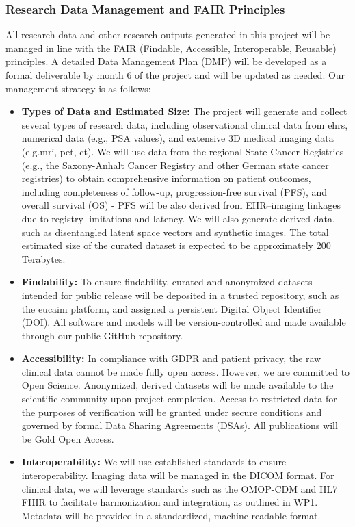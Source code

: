 \documentclass[11pt, a4paper]{article}
\begin{document}
\subsubsection{Research Data Management and FAIR Principles}
All research data and other research outputs generated in this project will be managed in line with the FAIR (Findable, Accessible, Interoperable, Reusable) principles. A detailed Data Management Plan (DMP) will be developed as a formal deliverable by month 6 of the project and will be updated as needed. Our management strategy is as follows:
\begin{itemize}
    \item \textbf{Types of Data and Estimated Size:} The project will generate and collect several types of research data, including observational clinical data from \gls{ehr}s, numerical data (e.g., PSA values), and extensive 3D medical imaging data (e.g.\gls{mri}, \gls{pet}, \gls{ct}). We will use data from the regional State Cancer Registries (e.g., the Saxony-Anhalt Cancer Registry and other German state cancer registries) to obtain comprehensive information on patient outcomes, including completeness of follow-up, progression-free survival (PFS), and overall survival (OS) - PFS will be also derived from EHR–imaging linkages due to registry limitations and latency. We will also generate derived data, such as disentangled latent space vectors and synthetic images. The total estimated size of the curated dataset is expected to be approximately 200 Terabytes.
    \item \textbf{Findability:} To ensure findability, curated and anonymized datasets intended for public release will be deposited in a trusted repository, such as the \gls{eucaim} platform, and assigned a persistent Digital Object Identifier (DOI). All software and models will be version-controlled and made available through our public GitHub repository.
    \item \textbf{Accessibility:} In compliance with GDPR and patient privacy, the raw clinical data cannot be made fully open access. However, we are committed to Open Science. Anonymized, derived datasets will be made available to the scientific community upon project completion. Access to restricted data for the purposes of verification will be granted under secure conditions and governed by formal Data Sharing Agreements (DSAs). All publications will be Gold Open Access.
    \item \textbf{Interoperability:} We will use established standards to ensure interoperability. Imaging data will be managed in the DICOM format. For clinical data, we will leverage standards such as the OMOP-CDM and HL7 FHIR to facilitate harmonization and integration, as outlined in WP1. Metadata will be provided in a standardized, machine-readable format.

\end{itemize}
\end{document}
